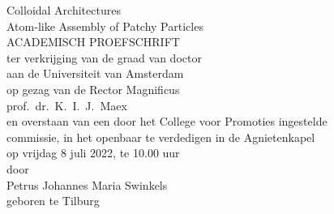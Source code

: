 


\begin{minipage}[c][190mm][c]{118mm} %
  \makeatletter
  \begin{center}
      \vspace*{1.2cm}
  
      { \huge Colloidal Architectures }\\
      \vspace*{0.2cm}
      { \Large Atom-like Assembly of Patchy Particles }\\ %
      [2.7cm]
  
      \textsc{\Large ACADEMISCH PROEFSCHRIFT}\\[1.2cm]
          
      \linespread{1.2}
      { \normalsize \textrm{
          ter verkrijging van de graad van doctor \\
          aan de Universiteit van Amsterdam \\
          op gezag van de Rector Magnificus \\
          prof.~dr.~K.~I.~J.~Maex \\
          en overstaan van een door het College voor Promoties ingestelde \\
          commissie, in het openbaar te verdedigen in de Agnietenkapel \\
          op vrijdag 8 juli 2022, te 10.00 uur \\ 
          \vspace{0.9cm}
          door \\[0.3cm]
          \vspace{0.9cm}
          Petrus Johannes Maria Swinkels\\[0.3cm]
          geboren te Tilburg \\[0.3cm]  
      } }
  
  \end{center}
  \makeatother

\end{minipage}
\clearpage